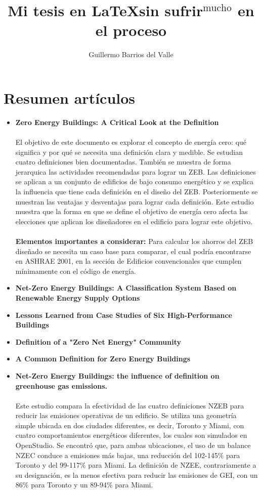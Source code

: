 \documentclass[10pt,twoside]{tesisIER}
\title{Mi tesis en \LaTeX sin sufrir$^{\text{mucho}}$ en el proceso}
\author{Guillermo Barrios del Valle}
\begin{document}
 
%
%

\chapter{Resumen artículos}

\begin{itemize}
\item \textbf{Zero Energy Buildings: A Critical Look at the Definition}
\\\\
El objetivo de este documento es explorar el concepto de energía cero: qué significa y por qué se necesita una definición clara y medible. Se estudian cuatro definiciones bien documentadas. También se muestra de forma jerarquica las actividades recomendadas para lograr un ZEB. Las definiciones se aplican a un conjunto de edificios de bajo consumo energético y se explica la influencia que tiene cada definición en el diseño del ZEB. Posteriormente se muestran las ventajas y desventajas para lograr cada definición. Este estudio muestra que la forma en que se define el objetivo de energía cero afecta las elecciones que aplican los diseñadores en el edificio para lograr este objetivo. 
\\\\
\textbf{Elementos importantes a considerar:} Para calcular los ahorros del ZEB diseñado se necesita un caso base para comparar, el cual podría encontrarse en ASHRAE 2001, en la sección de Edificios convencionales que cumplen mínimamente con el código de energía.


\item \textbf{Net-Zero Energy Buildings: A Classification System Based on Renewable Energy Supply Options}
\item \textbf{Lessons Learned from Case Studies of Six High-Performance Buildings}
\item \textbf{Definition of a "Zero Net Energy" Community}
\item \textbf{A Common Definition for Zero Energy Buildings}
\item \textbf{Net-Zero Energy Buildings: the influence of definition on greenhouse gas emissions.}
\\\\
Este estudio compara la efectividad de las cuatro definiciones NZEB para reducir las emisiones operativas de un edificio. Se utiliza una geometría simple ubicada en dos ciudades diferentes, es decir, Toronto y Miami, con cuatro comportamientos energéticos diferentes, los cuales son simulados en OpenStudio. Se encontró que, para ambas ubicaciones, el uso de un balance NZEC conduce a emisiones más bajas, una reducción del 102-145$\%$ para Toronto y del 99-117$\%$ para Miami. La definición de NZEE, contrariamente a su designación, es la menos efectiva para reducir las emisiones de GEI, con un 86$\%$ para Toronto y un 89-94$\%$ para Miami.


\end{itemize}
\end{document}
